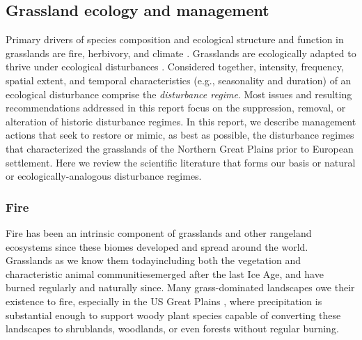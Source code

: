 \subsection{Grassland ecology and management}\label{ssec:ecol}

Primary drivers of species composition and ecological structure and function in grasslands are fire, herbivory, and climate \citep{blair2014}.
Grasslands are ecologically adapted to thrive under ecological disturbances \citep{samson2004}. 
Considered together, intensity, frequency, spatial extent, and temporal characteristics (e.g., seasonality and duration) of an ecological disturbance comprise the \emph{disturbance regime}. 
Most issues and resulting recommendations addressed in this report focus on the suppression, removal, or alteration of historic disturbance regimes. 
In this report, we describe management actions that seek to restore or mimic, as best as possible, the disturbance regimes that characterized the grasslands of the Northern Great Plains prior to European settlement. 
Here we review the scientific literature that forms our basis or natural or ecologically-analogous disturbance regimes.  

\subsubsection{Fire}

Fire has been an intrinsic component of grasslands and other rangeland ecosystems since these biomes developed and spread around the world. 
Grasslands as we know them today\textemdash including both the vegetation and characteristic animal communities\textemdash emerged after the last Ice Age, and have burned regularly and naturally since. 
Many grass-dominated landscapes owe their existence to fire, especially in the US Great Plains \citep{axelrod1985}, where precipitation is substantial enough to support woody plant species capable of converting these landscapes to shrublands, woodlands, or even forests without regular burning.

